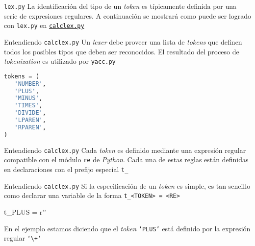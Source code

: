 \documentclass[pdf]{beamer}
\begin{document}
	\begin{frame}{{\texttt{lex.py}}}
		La identificación del tipo de un \emph{token} es típicamente definida por una serie de expresiones regulares. A continuación se mostrará como puede ser logrado con \texttt{lex.py} en \href{run:calclex.py}{\texttt{calclex.py}}
	\end{frame}
	
\begin{frame}[fragile]{Entendiendo \texttt{calclex.py}}
\justifying
Un \emph{lexer} debe proveer una lista de \emph{tokens} que definen todos los posibles tipos que deben ser reconocidos. El resultado del proceso de \emph{tokenization} es utilizado por \texttt{yacc.py}

\begin{example}
\begin{lstlisting}[language=Python]
tokens = (
   'NUMBER',
   'PLUS',
   'MINUS',
   'TIMES',
   'DIVIDE',
   'LPAREN',
   'RPAREN',
)
\end{lstlisting}			
\end{example}

\end{frame}

\begin{frame}{Entendiendo \texttt{calclex.py}}
	Cada \emph{token} es definido mediante una expresión regular compatible con el módulo \texttt{re} de \emph{Python}. Cada una de estas reglas están definidas en declaraciones con el prefijo especial \texttt{t\_}
\end{frame}

\begin{frame}[fragile]{Entendiendo \texttt{calclex.py}}
	Si la especificación de un \emph{token} es simple, es tan sencillo como declarar una variable de la forma \texttt{t\_<TOKEN> = <RE>}
	
\begin{example}
\begin{python}
t_PLUS = r'\+'
\end{python}
\end{example}

	En el ejemplo estamos diciendo que el \emph{token} \texttt{`PLUS'} está definido por la expresión regular \texttt{`\textbackslash+'}
\end{frame}
\end{document}
